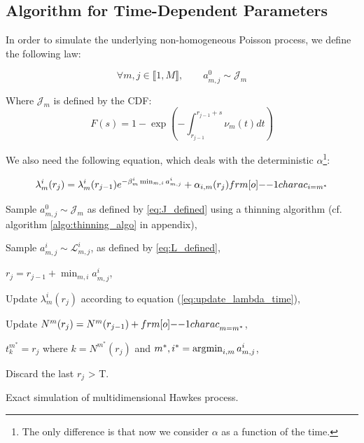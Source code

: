 \documentclass[11pt]{book}
\begin{document}
\subsection{Algorithm for Time-Dependent Parameters}

In order to simulate the underlying non-homogeneous Poisson process, we define the following law:

$$ \forall m,j \in  \llbracket 1, M \rrbracket, \qquad a_{m,j}^0 \sim \mathcal J_m  $$

Where $\mathcal J_m $ is defined by the CDF:
\begin{equation}
\label{eq:J_defined}
F(s) = 1 - \exp \left ( - \int_{r_{j-1}}^{r_{j-1} + s } \nu_m (t) dt \right )
\end{equation}

We also need the following equation, which deals with the deterministic $\alpha$\footnote{The only difference is that now we consider $\alpha$ as a function of the time.}:

\begin{equation}
\lambda_m^i ( r_j ) = \lambda_m^i ( r_{j-1} )  e^{ - \beta_m^i \min_{m,i} a_{m,j}^i } + \alpha_{i,m} (r_j) \11charac_{i = m^*}
\label{eq:update_lambda_time} 
\end{equation}




\begin{algorithm}[H]
\label{algo:simul_hp_time}
\SetAlgoLined

			{ 
					{
						{Sample $a_{m,j}^0 \sim \mathcal J_{m} $ as defined by \ref{eq:J_defined} using a thinning algorithm (cf. algorithm \ref{algo:thinning_algo} in appendix),
						
							{Sample $a_{m,j}^i \sim  \mathcal L^i_{m,j} $, as defined by \ref{eq:L_defined},
							}
						}
						
						$r_j = r_{j-1} + \min_{m,i} a_{m,j}^i$,
						
							{Update $\lambda_m^i ( r_j )$ according to equation (\ref{eq:update_lambda_time}),
							
							Update $N^m ( r_j ) = N^m( r_{j-1} ) + {\11charac}_{m = m^*} $,}
					$t_k^{m^*} = r_j$ where $k = N^{m^*} ( r_j ) $ and $ m^*,i^* = \operatorname*{\arg\!\min}_{i,m} a_{m,j}^i $,
					}
			Discard the last $r_j$ > T.
			}
\caption{Exact simulation of multidimensional Hawkes process.}
\end{algorithm}
\end{document}

